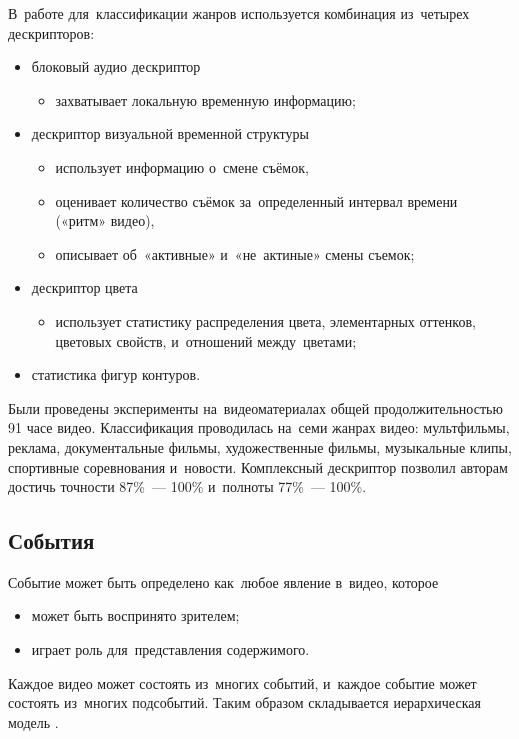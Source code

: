 В~работе \cite{Ionescu:2012} для~классификации жанров используется
комбинация из~четырех дескрипторов:
\begin{itemize}
    \item блоковый аудио дескриптор
    \begin{itemize}
        \item захватывает локальную временную информацию;
    \end{itemize}
    \item дескриптор визуальной временной структуры
    \begin{itemize}
        \item использует информацию о~смене съёмок,
        \item оценивает количество съёмок
            за~определенный интервал времени («ритм» видео),
        \item описывает об~«активные» и~«не~актиные» смены съемок;
    \end{itemize}
    \item дескриптор цвета
    \begin{itemize}
        \item использует статистику распределения цвета,
        элементарных оттенков, цветовых свойств, и~отношений между~цветами;
    \end{itemize}
    \item статистика фигур контуров.
\end{itemize}

Были проведены эксперименты на~видеоматериалах общей продолжительностью
91 часе видео. Классификация проводилась на~семи жанрах видео:
мультфильмы, реклама, документальные фильмы, художественные фильмы,
музыкальные клипы, спортивные соревнования и~новости.
Комплексный дескриптор позволил авторам достичь
точности  87\%~— 100\% и~полноты 77\%~— 100\%.



\subsection{События}

Событие может быть определено как~любое явление в~видео,
которое
\begin{itemize}
    \item может быть воспринято зрителем;
    \item играет роль для~представления содержимого.
\end{itemize}
Каждое видео может состоять из~многих событий,
и~каждое событие может состоять из~многих подсобытий.
Таким образом складывается иерархическая модель \cite{Chang:2002}.

